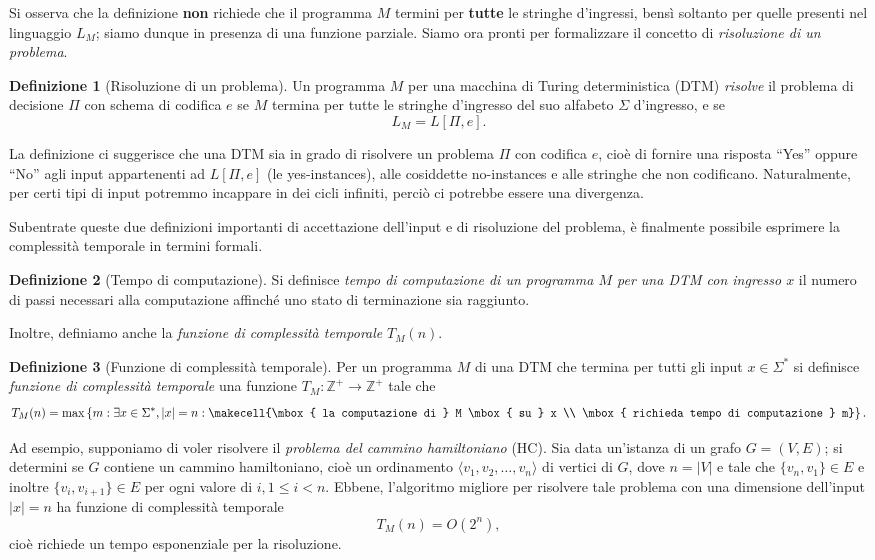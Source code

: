 \documentclass[10pt]{\classname}
\theoremstyle{newlinethm}
\theoremstyle{theorem}
\theoremstyle{definition}
\newtheorem{definizione}{Definizione}[section]
\theoremstyle{definition}
\theoremstyle{definition}
\theoremstyle{definition}
\begin{document}
Si osserva che la definizione \textbf{non} richiede che il programma $M$ termini per \textbf{tutte} le stringhe d'ingressi, bensì soltanto per quelle presenti nel linguaggio $L_M$; siamo dunque in presenza di una funzione parziale. Siamo ora pronti per formalizzare il concetto di \emph{risoluzione di un problema}.
\begin{definizione}[Risoluzione di un problema]
    Un programma $M$ per una macchina di Turing deterministica (DTM) \emph{risolve} il problema di decisione $\Pi$ con schema di codifica $e$ se $M$ termina per tutte le stringhe d'ingresso del suo alfabeto $\Sigma$ d'ingresso, e se \[L_M = L[\Pi, e].\]
\end{definizione}
La definizione ci suggerisce che una DTM sia in grado di risolvere un problema $\Pi$ con codifica $e$, cioè di fornire una risposta ``Yes'' oppure ``No'' agli input appartenenti ad $L[\Pi, e]$ (le yes-instances), alle cosiddette no-instances e alle stringhe che non codificano. Naturalmente, per certi tipi di input potremmo incappare in dei cicli infiniti, perciò ci potrebbe essere una divergenza.

Subentrate queste due definizioni importanti di accettazione dell'input e di risoluzione del problema, è finalmente possibile esprimere la complessità temporale in termini formali.
\begin{definizione}[Tempo di computazione]
    Si definisce \emph{tempo di computazione di un programma $M$ per una DTM con ingresso $x$} il numero di passi necessari alla computazione affinché uno stato di terminazione sia raggiunto.
\end{definizione}
Inoltre, definiamo anche la \emph{funzione di complessità temporale} $T_M(n)$.
\begin{definizione}[Funzione di complessità temporale]
    Per un programma $M$ di una DTM che termina per tutti gli input $x \in \Sigma^*$ si definisce \emph{funzione di complessità temporale} una funzione $T_M : \mathbb Z^+ \rightarrow \mathbb Z^+$ tale che \[T_M(n) = \max \left\{m : \exists x \in \Sigma^*, |x| = n :\makecell{\mbox{ la computazione di } M \mbox{ su } x \\ \mbox{ richieda tempo di computazione } m}\right\}.\]
\end{definizione}

Ad esempio, supponiamo di voler risolvere il \emph{problema del cammino hamiltoniano} (HC). Sia data un'istanza di un grafo $G = (V,E)$; si determini se $G$ contiene un cammino hamiltoniano, cioè un ordinamento $\langle v_1, v_2, \dots, v_n\rangle$ di vertici di $G$, dove $n = |V|$ e tale che $\{v_n, v_1\} \in E$ e inoltre $\{v_i,v_{i+1}\} \in E$ per ogni valore di $i, 1\leq i < n$. Ebbene, l'algoritmo migliore per risolvere tale problema con una dimensione dell'input $|x| = n$ ha funzione di complessità temporale \[T_M(n) = O(2^n),\] cioè richiede un tempo esponenziale per la risoluzione.
\end{document}
